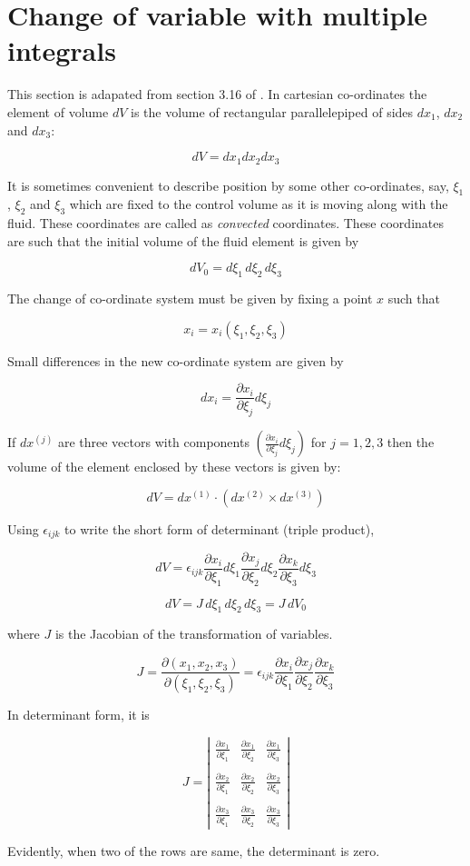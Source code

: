 \section{Change of variable with multiple integrals}
\label{variablechange}

This section is adapated from section 3.16 of \cite{aris}. In cartesian co-ordinates the element of volume $dV$ is the volume of rectangular parallelepiped of sides $dx_1$, $dx_2$ and $dx_3$:

$$ dV =  dx_1 dx_2 dx_3 $$

It is sometimes convenient to describe position by some other co-ordinates, say, $\xi_1$, $\xi_2$ and $\xi_3$ which are fixed to the control volume as it is moving along with the fluid. These coordinates are called as {\it convected} coordinates. These coordinates are such that the initial volume of the fluid element is given by

$$ dV_0 = d\xi_1 \, d\xi_2 \, d\xi_3 $$


The change of co-ordinate system must be given
 by fixing a point $x$ such that 

$$x_i = x_i(\xi_1, \xi_2, \xi_3) $$

Small differences in the new co-ordinate system are given by 

$$ dx_i = \frac{\partial x_i}{\partial \xi_j} d\xi_j $$

If $dx^{(j)}$ are three vectors with components $(\frac{\partial x_i}{\partial \xi_j} d\xi_j)$ for $j=1,2,3$ then the volume of the element enclosed by these vectors is given by:

$$ dV = dx^{(1)} \cdot ( dx^{(2)} \times dx^{(3)} ) $$

Using $\epsilon_{ijk}$ to write the short form of determinant (triple product),

$$ dV = \epsilon_{ijk} \frac{\partial x_i}{\partial \xi_1} d\xi_1 \frac{\partial x_j}{\partial \xi_2} d\xi_2 \frac{\partial x_k}{\partial \xi_3} d\xi_3  $$


$$ dV = J \, d\xi_1 \, d\xi_2 \, d\xi_3  = J \, dV_0$$

where $J$ is the Jacobian of the transformation of variables.

$$ J = \frac{\partial(x_1, x_2, x_3)}{\partial(\xi_1, \xi_2, \xi_3)} = \epsilon_{ijk} \frac{\partial x_i}{\partial \xi_1} \frac{\partial x_j}{\partial \xi_2} \frac{\partial x_k}{\partial \xi_3} $$

In determinant form, it is 

\begin{equation}
J = \left|
\begin{array}{lll}
\frac{\partial x_1}{\partial \xi_1} &  \frac{\partial x_1}{\partial \xi_2} & \frac{\partial x_1}{\partial \xi_3} \\
\\
\frac{\partial x_2}{\partial \xi_1} &  \frac{\partial x_2}{\partial \xi_2} & \frac{\partial x_2}{\partial \xi_3} \\
\\
\frac{\partial x_3}{\partial \xi_1} &  \frac{\partial x_3}{\partial \xi_2} & \frac{\partial x_3}{\partial \xi_3}
\end{array}
\right|
\end{equation}

Evidently, when two of the rows are same, the determinant is zero.


